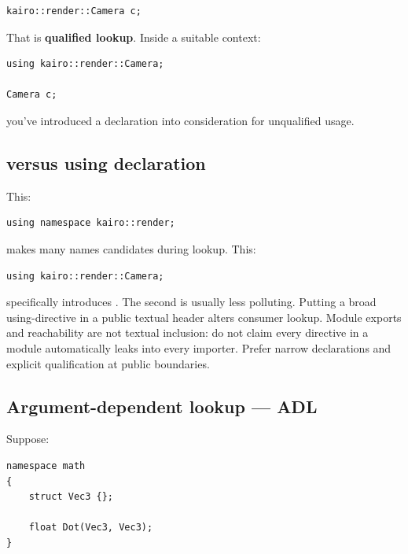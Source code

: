 \begin{verbatim}
kairo::render::Camera c;
\end{verbatim}

That is \textbf{qualified lookup}. Inside a suitable context:

\begin{verbatim}
using kairo::render::Camera;

Camera c;
\end{verbatim}

you've introduced a declaration into consideration for unqualified usage.

\subsection{\texorpdfstring{ versus using declaration}{ versus using declaration}}\label{05-engine-i-ch002-using-namespace-versus-using-declaration}

\hypertarget{05-engine-i-ch002-using-namespace-versus-using-declaration}{}

This:

\begin{verbatim}
using namespace kairo::render;
\end{verbatim}

makes many names candidates during lookup. This:

\begin{verbatim}
using kairo::render::Camera;
\end{verbatim}

specifically introduces . The second is usually less polluting. Putting a broad using-directive in a public textual header alters consumer lookup. Module exports and reachability are not textual inclusion: do not claim every directive in a module automatically leaks into every importer. Prefer narrow declarations and explicit qualification at public boundaries.

\subsection{Argument-dependent lookup --- ADL}\label{05-engine-i-ch002-argument-dependent-lookup-adl}

\hypertarget{05-engine-i-ch002-argument-dependent-lookup-adl}{}

Suppose:

\begin{verbatim}
namespace math
{
    struct Vec3 {};

    float Dot(Vec3, Vec3);
}
\end{verbatim}

